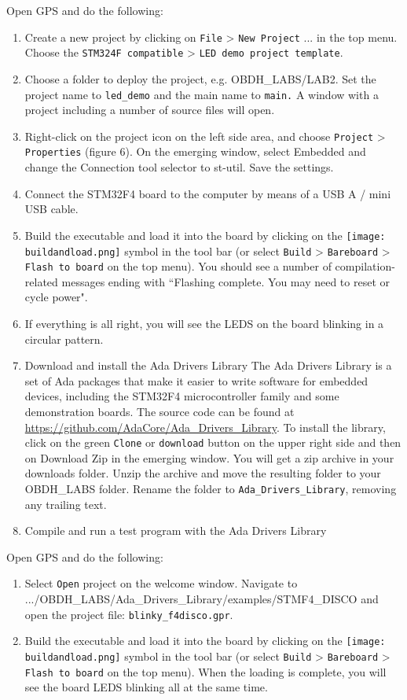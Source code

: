 Open GPS and do the following:
\begin{enumerate}
\item Create a new project by clicking on {\tt File} > {\tt New Project} ... in the top menu. Choose the {\tt STM324F compatible} > {\tt LED demo project template}.
\item	Choose a folder to deploy the project, e.g. OBDH\_LABS/LAB2. Set the project name to {\tt led\_demo} and the main name to {\tt main.} A window with a project including a number of source files will open.
\item	Right-click on the project icon on the left side area, and choose {\tt Project} > {\tt Properties} (figure 6). On the emerging window, select Embedded and change the Connection tool selector to st-util. Save the settings.
\item	Connect the STM32F4 board to the computer by means of a USB A / mini USB cable.
\item	Build the executable and load it into the board by clicking on the
\hbox{\texttt{[image: buildandload.png]}} symbol in the tool bar (or select {\tt Build} > {\tt Bareboard} > {\tt Flash to board} on the top menu). You should see a number of compilation-related messages ending with ``Flashing complete. You may need to reset or cycle power".
\item	If everything is all right, you will see the LEDS on the board blinking in a circular pattern.
\item Download and install the Ada Drivers Library
The Ada Drivers Library is a set of Ada packages that make it easier to write software for embedded devices, including the STM32F4 microcontroller family and some demonstration boards. The source code can be found at \url{https://github.com/AdaCore/Ada\_Drivers\_Library}. To install the library, click on the green {\tt Clone} or {\tt download} button on the upper right side and then on Download Zip in the emerging window. You will get a zip archive in your downloads folder. Unzip the archive and move the resulting folder to your OBDH\_LABS folder. Rename the folder to {\tt Ada\_Drivers\_Library}, removing any trailing text.
\item Compile and run a test program with the Ada Drivers Library
\end{enumerate}
Open GPS and do the following:
\begin{enumerate}
\item Select {\tt Open} project on the welcome window. Navigate to .../OBDH\_LABS/\-Ada\_Drivers\_Li\-brary/\-examples/STMF4\_DISCO and open the project file: {\tt blinky\-\_f4disco.gpr}.
\item	Build the executable and load it into the board by clicking on the \hbox{\texttt{[image: buildandload.png]}} symbol in the tool bar (or select {\tt Build} > {\tt Bareboard} > {\tt Flash to board} on the top menu). When the loading is complete, you will see the board LEDS blinking all at the same time.
\end{enumerate}

